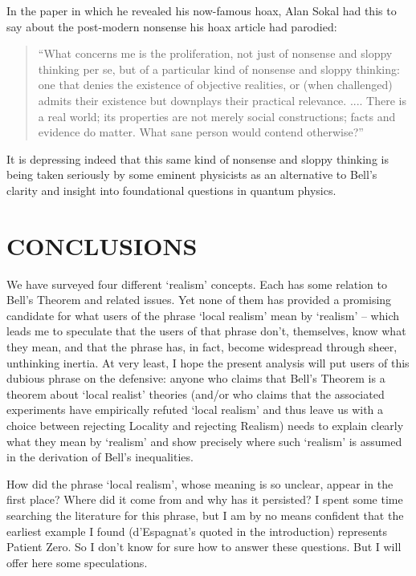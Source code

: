 \documentclass[12pt]{article}
\begin{document}
In the paper in which he revealed his now-famous hoax, Alan Sokal had
this to say about the post-modern nonsense his hoax article had parodied:
\begin{quote}
``What concerns me is the proliferation, not just of nonsense
and sloppy thinking per se, but of a particular kind of nonsense and
sloppy thinking:  one that denies the existence of objective realities,
or (when challenged) admits their existence but downplays their practical
relevance.  ....  There is a real world; its properties are not merely
social constructions; facts and evidence do matter.  What sane person
would contend otherwise?'' \cite{sokal}
\end{quote}
It is depressing indeed that this same kind of nonsense and sloppy
thinking is being taken seriously by some eminent physicists
as an alternative to Bell's clarity and insight into foundational
questions in quantum physics.



\section{CONCLUSIONS}

We have surveyed four different `realism' concepts.  Each has some
relation to Bell's Theorem and related issues.  Yet none of them has
provided a promising candidate for what users of the phrase `local
realism' mean by `realism' -- which leads me to speculate that the
users of that phrase don't, themselves, know what they mean, and that
the phrase has, in fact, become widespread through sheer, unthinking
inertia.  At very least, I hope the present analysis will put users of
this dubious phrase on the defensive:  anyone who claims that Bell's
Theorem is a theorem about `local realist' theories (and/or who
claims that the associated experiments have empirically refuted
`local realism' and thus leave us with a choice between rejecting
Locality and rejecting Realism) needs to explain clearly what they 
mean by `realism' and show precisely where such `realism' is assumed
in the derivation of Bell's inequalities.

How did the phrase `local realism', 
whose meaning is so unclear, appear in the first
place?  Where did it come from and why has it persisted?  I spent some
time searching the literature for this phrase, but I am by no means
confident that the earliest example I found (d'Espagnat's quoted in
the introduction) represents Patient Zero.
So I don't know for sure how to answer these questions.  But I
will offer here some speculations.
\end{document}
